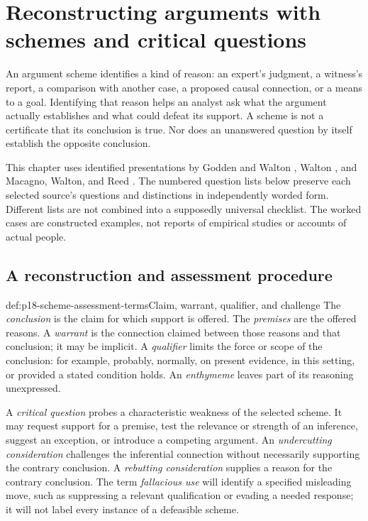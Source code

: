 \chapter{Reconstructing arguments with schemes and critical questions}
\label{sec:p18-argument-schemes-critical-questions}

An argument scheme identifies a kind of reason: an expert's judgment,
a witness's report, a comparison with another case, a proposed causal
connection, or a means to a goal. Identifying that reason helps an analyst
ask what the argument actually establishes and what could defeat its
support. A scheme is not a certificate that its conclusion is true.
Nor does an unanswered question by itself establish the opposite conclusion.

This chapter uses identified presentations by Godden and Walton
\cite{GoddenWalton2007SchemesQuestions}, Walton
\cite{Walton2014AnalogySchemes,Walton2016ArgumentEvaluation}, and
Macagno, Walton, and Reed \cite{MacagnoWaltonReed2017Schemes}.
The numbered question lists below preserve each selected source's
questions and distinctions in independently worded form.
Different lists are not combined into a supposedly universal checklist.
The worked cases are constructed examples, not reports of empirical
studies or accounts of actual people.

\section{A reconstruction and assessment procedure}

\begin{hbdefinition}{def:p18-scheme-assessment-terms}{Claim, warrant, qualifier, and challenge}
The \emph{conclusion} is the claim for which support is offered.
The \emph{premises} are the offered reasons.
A \emph{warrant} is the connection claimed between those reasons and
that conclusion; it may be implicit.
A \emph{qualifier} limits the force or scope of the conclusion:
for example, probably, normally, on present evidence, in this setting,
or provided a stated condition holds.
An \emph{enthymeme} leaves part of its reasoning unexpressed.

A \emph{critical question} probes a characteristic weakness of the selected
scheme. It may request support for a premise, test the relevance or strength
of an inference, suggest an exception, or introduce a competing argument.
An \emph{undercutting consideration} challenges the inferential connection
without necessarily supporting the contrary conclusion.
A \emph{rebutting consideration} supplies a reason for the contrary
conclusion. The term \emph{fallacious use} will identify a specified
misleading move, such as suppressing a relevant qualification or evading
a needed response; it will not label every instance of a defeasible scheme.
\end{hbdefinition}

